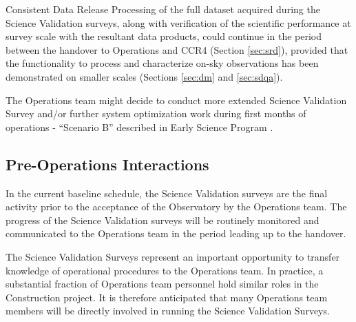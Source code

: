 Consistent Data Release Processing of the full dataset acquired during the Science Validation surveys, along with verification of the scientific performance at survey scale with the resultant data products, could continue in the period between the handover to Operations and CCR4 (Section \ref{sec:srd}), provided that the functionality to process and characterize on-sky observations has been demonstrated on smaller scales (Sections \ref{sec:dm} and \ref{sec:sdqa}).

The Operations team might decide to conduct more extended Science Validation Survey and/or further system optimization work during first months of operations - ``Scenario B'' described in Early Science Program .


\subsection{Pre-Operations Interactions}

In the current baseline schedule, the Science Validation surveys are the final activity prior to the acceptance of the Observatory by the Operations team.
The progress of the Science Validation surveys will be routinely monitored and communicated to the Operations team in the period leading up to the handover.

The Science Validation Surveys represent an important opportunity to transfer knowledge of operational procedures to the Operations team.
In practice, a substantial fraction of Operations team personnel hold similar roles in the Construction project.
It is therefore anticipated that many Operations team members will be directly involved in running the Science Validation Surveys.

